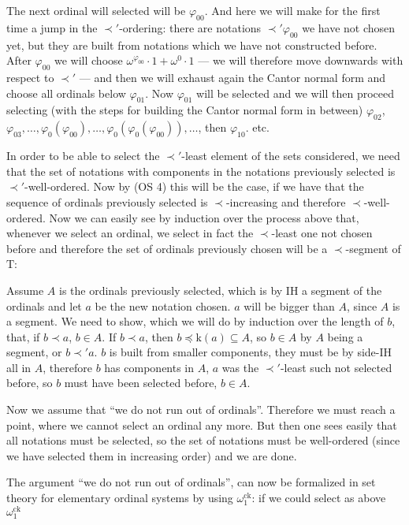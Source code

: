 \documentclass[10pt]{article}
\def\k{\mathrm{k}}
\def\T{\mathrm{T}}
\def\ck{\mathrm{ck}}
\begin{document}
The next ordinal will selected will be $\varphi_00$. And here we will make for
the first time a jump in the $\prec'$-ordering: there are notations 
$\prec'\varphi_00$ we
have not chosen yet, but they are built  from notations which
we have not constructed before. After $\varphi_00$ we will choose
$\omega^{\varphi_00} \cdot 1 + \omega^0 \cdot 1$ --- we 
will therefore move downwards with respect to $\prec'$ ---
and then we will exhaust again the  Cantor normal form and choose
all ordinals below $\varphi_01$.
Now $\varphi_01$ will be selected and we will
then proceed selecting (with the steps for building
the Cantor normal form in between) 
$\varphi_02$, $\varphi_03 ,\ldots,\varphi_0(\varphi_00) ,\ldots, 
\varphi_0(\varphi_0(\varphi_00)) ,\ldots$,
then $\varphi_10$. etc.\par 
In order to be able to select the $\prec'$-least element of the
sets considered, we need that the set of 
notations with components in the notations previously selected is
$\prec'$-well-ordered. Now by (OS 4) this will be the case, if  we have that
the sequence of ordinals previously selected is $\prec$-increasing
and therefore $\prec$-well-ordered. Now we can easily
see by induction over the process above that, whenever we select an ordinal, we select in fact the
$\prec$-least one not chosen before and therefore the set of ordinals
previously chosen will be a $\prec$-segment of $\T$:\par 
Assume $A$ is the ordinals previously selected, which is by IH a segment
of the ordinals and let $a$ be the new notation chosen. $a$ will be bigger
than $A$, since $A$ is a segment. We need to show, which we will do
by induction over the length of $b$,  that, if $b \prec a$, $b \in A$.
If $b \prec a$, then $b \preceq \k(a) \subseteq A$, so $b \in A$ by
$A$ being a segment, or $b \prec ' a$.
$b$ is built from smaller components, they must be by side-IH all in $A$,
therefore $b$ has components in $A$, $a$ was the $\prec'$-least such 
not selected before, so $b$ must have been selected before, $b \in A$.\par 
Now we assume that ``we do not run out of ordinals''. Therefore we
must  reach a point, where we cannot  select an ordinal any more. But then
one sees easily that all notations must be selected, so the set of 
notations must be well-ordered (since we have selected them in
increasing order) and we are done.\par 
The argument ``we do not  run out of ordinals'', can now be  
formalized in set theory for elementary ordinal systems by using  
$\omega_1^\ck$: if we could select as above $\omega_1^{\ck}$ 
\end{document}
